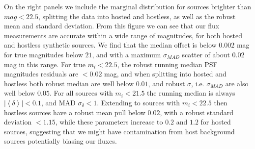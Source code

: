On the right panels we include the marginal distribution for sources brighter than $mag < 22.5$, splitting the data into hosted and hostless, as well as the robust mean and standard deviation.
%
From this figure we can see that our \gls{flux} measurements are accurate within a wide range of magnitudes, for both hosted and hostless synthetic sources. 
We find that the median offset is below $0.002$ mag for true magnitudes below $21$, and with a maximum $\sigma_{MAD}$ scatter of about $0.02$ mag in this range.
For true $m_i < 22.5$, the robust running median PSF magnitudes residuals are $<0.02$ mag, and when splitting into hosted and hostless both robust median
are well below $0.01$, and robust $\sigma$, i.e. $\sigma_{MAD}$ are also well below $0.05$.
%
For all sources with $m_i<21.5$ the running median is always $|\left<\delta\right>| <0.1$, and MAD $\sigma_\delta < 1$. 
Extending to sources with $m_i<22.5$ then  hostless sources have  a robust mean pull below $0.02$, with a robust standard deviation $<1.15$, while these parameters increase to $0.2$ and $1.2$ for hosted sources, suggesting that we might have contamination from host background sources potentially biasing our fluxes.
%
